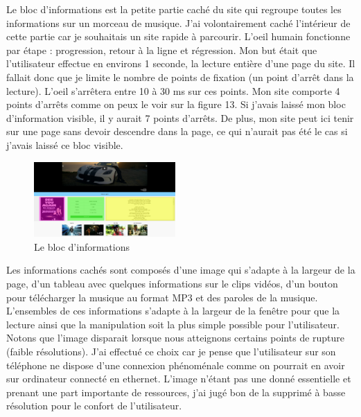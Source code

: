 \documentclass{article}
\begin{document}
Le bloc d'informations est la petite partie cach\'e du site qui regroupe toutes les informations sur un morceau de musique. J'ai volontairement cach\'e l'int\'erieur de cette partie car je souhaitais un site rapide \`a parcourir. L'oeil humain fonctionne par \'etape : progression, retour \`a la ligne et r\'egression. Mon but \'etait que l'utilisateur effectue en environs 1 seconde, la lecture enti\`ere d'une page du site. Il fallait donc que je limite le nombre de points de fixation (un point d'arr\^et dans la lecture). L'oeil s'arr\^etera entre 10 \`a 30 ms sur ces points. Mon site comporte 4 points d'arr\^ets comme on peux le voir sur la figure 13. Si j'avais laiss\'e mon bloc d'information visible, il y aurait 7 points d'arr\^ets. De plus, mon site peut ici tenir sur une page sans devoir descendre dans la page, ce qui n'aurait pas \'et\'e le cas si j'avais laiss\'e ce bloc visible.\\

\begin{figure}
  \vspace{-25pt}
  \begin{center}
    \includegraphics[width=0.48\textwidth]{p5}
  \end{center}
  \vspace{-20pt}
  \caption{Le bloc d'informations}
  \vspace{-10pt}
\end{figure} 

Les informations cach\'es sont compos\'es d'une image qui s'adapte \`a la largeur de la page, d'un tableau avec quelques informations sur le clips vid\'eos, d'un bouton pour t\'el\'echarger la musique au format MP3 et des paroles de la musique. L'ensembles de ces informations s'adapte \`a la largeur de la fen\^etre pour que la lecture ainsi que la manipulation soit la plus simple possible pour l'utilisateur. Notons que l'image disparait lorsque nous atteignons certains points de rupture (faible r\'esolutions). J'ai effectu\'e ce choix car je pense que l'utilisateur sur son t\'el\'ephone ne dispose d'une connexion ph\'enom\'enale comme on pourrait en avoir sur ordinateur connect\'e en ethernet. L'image n'\'etant pas une donn\'e essentielle et prenant une part importante de ressources, j'ai jug\'e bon de la supprim\'e \`a basse r\'esolution pour le confort de l'utilisateur.\\
\end{document}

